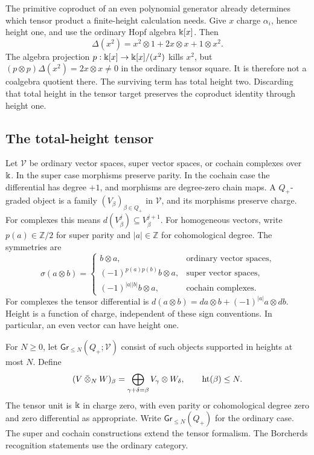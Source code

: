 The primitive coproduct of an even polynomial generator already determines
which tensor product a finite-height calculation needs.  Give $x$ charge
$\alpha_i$, hence height one, and use the ordinary Hopf algebra $\Bbbk[x]$.
Then
\begin{equation}
 \Delta(x^2)=x^2\otimes1+2x\otimes x+1\otimes x^2.
 \label{polynomial-cross-term}
\end{equation}
The algebra projection $p:\Bbbk[x]\to\Bbbk[x]/(x^2)$ kills $x^2$, but
$(p\otimes p)\Delta(x^2)=2x\otimes x\neq0$ in the ordinary tensor square.
It is therefore not a coalgebra quotient there.  The surviving term has
total height two.  Discarding that total height in the tensor target
preserves the coproduct identity through height one.

\subsection{The total-height tensor}
\label{sec:height-tensor}

Let $\mathcal V$ be ordinary vector spaces, super vector spaces, or cochain
complexes over $\Bbbk$.  In the super case morphisms preserve parity.
In the cochain case the differential has degree $+1$, and morphisms are
degree-zero chain maps.  A $Q_+$-graded object is a family
$(V_\beta)_{\beta\in Q_+}$ in $\mathcal V$, and its morphisms preserve charge.
For complexes this means $d(V_\beta^j)\subseteq V_\beta^{j+1}$.
For homogeneous vectors, write $p(a)\in\mathbb Z/2$ for super parity and
$|a|\in\mathbb Z$ for cohomological degree.  The symmetries are
\[
 \sigma(a\otimes b)=
 \begin{cases}
 b\otimes a,&\text{ordinary vector spaces},\\
 (-1)^{p(a)p(b)}b\otimes a,&\text{super vector spaces},\\
 (-1)^{|a||b|}b\otimes a,&\text{cochain complexes}.
 \end{cases}
\]
For complexes the tensor differential is
$d(a\otimes b)=da\otimes b+(-1)^{|a|}a\otimes db$.
Height is a function of charge, independent of these sign conventions.
In particular, an even vector can have height one.

For $N\geq0$, let $\mathsf{Gr}_{\leq N}(Q_+;\mathcal V)$ consist of such
objects supported in heights at most $N$.  Define
\begin{equation}
 (V\mathbin{\bar\otimes_N}W)_\beta
 =\bigoplus_{\gamma+\delta=\beta}V_\gamma\otimes W_\delta,
 \qquad \operatorname{ht}(\beta)\leq N.\label{finite-tensor}
\end{equation}
The tensor unit is $\Bbbk$ in charge zero, with even parity or cohomological
degree zero and zero differential as appropriate.  Write
$\mathsf{Gr}_{\leq N}(Q_+)$ for the ordinary case.
The super and cochain constructions extend the tensor formalism.
The Borcherds recognition statements use the ordinary category.

